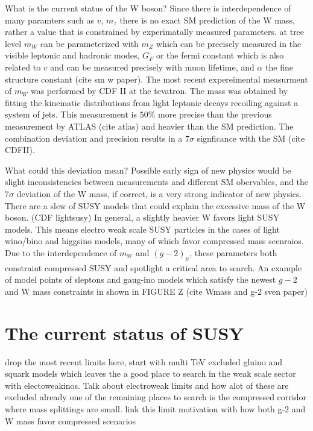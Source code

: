 What is the current status of the W boson?
Since there is interdependence of many paramters such as $v$, $m_z$ there is no exact SM prediction of the W mass, rather a value that is constrained by experimatally measured parameters. at tree level $m_W$ can be parameterized with $m_Z$ which can be precisely measured in the visible leptonic and hadronic modes, $G_F$ or the fermi constant which is also related to $v$ and can be measured precisely with muon lifetime, and $\alpha$ the fine structure constant (cite sm w paper). The most recent expereimental measurment of $m_W$ was performed by CDF II at the tevatron. The mass was obtained by fitting the kinematic distributions from light leptonic decays recoiling against a system of jets. This measurement is $50\%$ more precise than the previous measurement by ATLAS (cite atlas) and heavier than the SM prediction. The combination deviation and precision results in a $7\sigma$ signficance with the SM (cite CDFII).  


What could this deviation mean?
Possible early sign of new physics would be slight inconsistencies between measurements and different SM obervables, and the $7\sigma$ deviation of the W mass, if correct, is a very strong indicator of new physics. There are a slew of SUSY models that could explain the excessive mass of the W boson. (CDF lightsusy) In general, a slightly heavier W favors light SUSY models. This means electro weak scale SUSY particles in the cases of light wino/bino and higgsino models, many of which favor compressed mass scenraios. Due to the interdependence of $m_W$ and $(g-2)_\mu$, these parameters both constraint compressed SUSY and spotlight a critical area to search. An example of model points of sleptons and gaug-ino models which satisfy the newest $g-2$ and W mass constraints in shown in FIGURE Z (cite Wmass and g-2 sven paper)


\section{The current status of SUSY}
drop the most recent limits here, start with multi TeV excluded gluino and squark models which leaves the a good place to search in the weak scale sector with electoweakinos. Talk about electroweak limits and how alot of these are excluded already one of the remaining places to search is the compressed corridor where mass splittings are small. link this limit motivation with how both g-2 and W mass favor compressed scenarios



